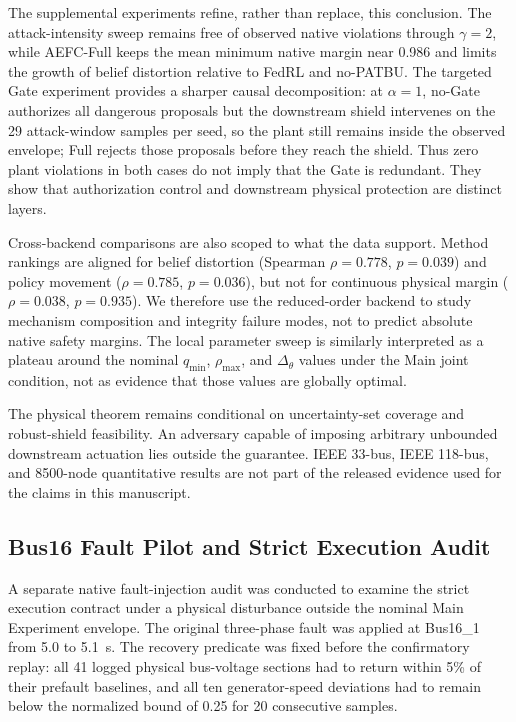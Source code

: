 The supplemental experiments refine, rather than replace, this conclusion. The attack-intensity sweep remains free of observed native violations through $\gamma=2$, while AEFC-Full keeps the mean minimum native margin near 0.986 and limits the growth of belief distortion relative to FedRL and no-PATBU. The targeted Gate experiment provides a sharper causal decomposition: at $\alpha=1$, no-Gate authorizes all dangerous proposals but the downstream shield intervenes on the 29 attack-window samples per seed, so the plant still remains inside the observed envelope; Full rejects those proposals before they reach the shield. Thus zero plant violations in both cases do not imply that the Gate is redundant. They show that authorization control and downstream physical protection are distinct layers.

Cross-backend comparisons are also scoped to what the data support. Method rankings are aligned for belief distortion (Spearman $\rho=0.778$, $p=0.039$) and policy movement ($\rho=0.785$, $p=0.036$), but not for continuous physical margin ($\rho=0.038$, $p=0.935$). We therefore use the reduced-order backend to study mechanism composition and integrity failure modes, not to predict absolute native safety margins. The local parameter sweep is similarly interpreted as a plateau around the nominal $q_{\min}$, $\rho_{\max}$, and $\Delta_\theta$ values under the Main joint condition, not as evidence that those values are globally optimal.

The physical theorem remains conditional on uncertainty-set coverage and robust-shield feasibility. An adversary capable of imposing arbitrary unbounded downstream actuation lies outside the guarantee. IEEE 33-bus, IEEE 118-bus, and 8500-node quantitative results are not part of the released evidence used for the claims in this manuscript.

\subsection{Bus16 Fault Pilot and Strict Execution Audit}
A separate native fault-injection audit was conducted to examine the strict execution contract under a physical disturbance outside the nominal Main Experiment envelope. The original three-phase fault was applied at Bus16\_1 from 5.0 to 5.1~s. The recovery predicate was fixed before the confirmatory replay: all 41 logged physical bus-voltage sections had to return within 5\% of their prefault baselines, and all ten generator-speed deviations had to remain below the normalized bound of 0.25 for 20 consecutive samples.

